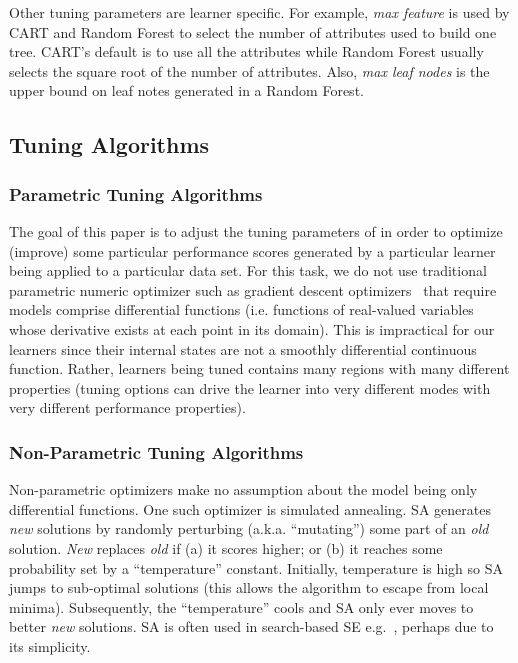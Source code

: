 Other tuning parameters are learner specific. For example,
{\em max feature} is used by
CART and Random Forest to select the number of attributes
used to build one tree.
CART's default is to use all the attributes while 
Random Forest usually selects the square root of the number
of attributes.
Also,
  {\em max leaf nodes} is the upper bound on leaf notes generated in a 
  Random Forest.



\subsection{Tuning Algorithms}


 \subsubsection{Parametric Tuning Algorithms}
The  goal of this paper is to adjust the tuning parameters of 
in order to   optimize (improve) some particular performance scores
generated by a particular learner being applied to  a particular data set.
For this task, we do not use traditional parametric numeric optimizer  
such as  gradient descent optimizers~\cite{saltelli00} that require models comprise
differential functions (i.e. functions of real-valued variables whose derivative exists at each point in its domain).
This is impractical  for  our learners since their internal states are   not a smoothly differential continuous function.
Rather, learners being tuned  contains many regions with many different properties (tuning options can
drive the learner into very different modes with very different performance properties).


 \subsubsection{Non-Parametric Tuning Algorithms}
 
Non-parametric  optimizers   make no assumption
about the model being only differential functions. One such optimizer
is simulated annealing. SA generates {\em new} solutions
 by randomly perturbing (a.k.a. ``mutating'') some part of an {\em old}
 solution.  {\em New} replaces {\em old} if (a) it scores higher; or
 (b) it reaches some probability set by a ``temperature'' constant. Initially,
 temperature is high so SA jumps to sub-optimal solutions (this allows
 the algorithm to escape from local minima). Subsequently, the
 ``temperature'' cools and SA only ever moves to better {\em new}
 solutions. 
 SA is often used in search-based SE
 e.g.~\cite{fea02a,me07f}, perhaps due to its simplicity.

